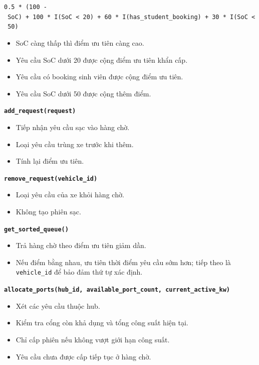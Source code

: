 \documentclass[11pt,a4paper]{article}
\providecommand{\tightlist}{%
  \setlength{\itemsep}{0pt}\setlength{\parskip}{0pt}}
\begin{document}
\texttt{0.5\ *\ (100\ -\ SoC)\ +\ 100\ *\ I(SoC\ \textless{}\ 20)\ +\ 60\ *\ I(has\_student\_booking)\ +\ 30\ *\ I(SoC\ \textless{}\ 50)}

\begin{itemize}
\tightlist
\item
  SoC càng thấp thì điểm ưu tiên càng cao.
\item
  Yêu cầu SoC dưới 20 được cộng điểm ưu tiên khẩn cấp.
\item
  Yêu cầu có booking sinh viên được cộng điểm ưu tiên.
\item
  Yêu cầu SoC dưới 50 được cộng thêm điểm.
\end{itemize}

\textbf{\texttt{add\_request(request)}}

\begin{itemize}
\tightlist
\item
  Tiếp nhận yêu cầu sạc vào hàng chờ.
\item
  Loại yêu cầu trùng xe trước khi thêm.
\item
  Tính lại điểm ưu tiên.
\end{itemize}

\textbf{\texttt{remove\_request(vehicle\_id)}}

\begin{itemize}
\tightlist
\item
  Loại yêu cầu của xe khỏi hàng chờ.
\item
  Không tạo phiên sạc.
\end{itemize}

\textbf{\texttt{get\_sorted\_queue()}}

\begin{itemize}
\tightlist
\item
  Trả hàng chờ theo điểm ưu tiên giảm dần.
\item
  Nếu điểm bằng nhau, ưu tiên thời điểm yêu cầu sớm hơn; tiếp theo là
  \texttt{vehicle\_id} để bảo đảm thứ tự xác định.
\end{itemize}

\textbf{\texttt{allocate\_ports(hub\_id,\ available\_port\_count,\ current\_active\_kw)}}

\begin{itemize}
\tightlist
\item
  Xét các yêu cầu thuộc hub.
\item
  Kiểm tra cổng còn khả dụng và tổng công suất hiện tại.
\item
  Chỉ cấp phiên nếu không vượt giới hạn công suất.
\item
  Yêu cầu chưa được cấp tiếp tục ở hàng chờ.
\end{itemize}
\end{document}
